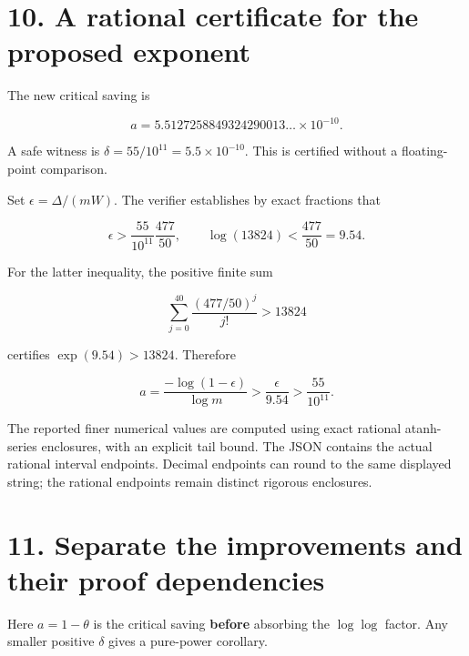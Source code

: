 \documentclass[
  11pt,
  letterpaper,
]{article}
\begin{document}
\section{10. A rational certificate for the proposed
exponent}\label{a-rational-certificate-for-the-proposed-exponent}

The new critical saving is

\[
a=5.5127258849324290013\ldots\times10^{-10}.
\]

A safe witness is \(\delta=55/10^{11}=5.5\times10^{-10}\). This is
certified without a floating-point comparison.

Set \(\epsilon=\Delta/(mW)\). The verifier establishes by exact
fractions that

\[
\epsilon>\frac{55}{10^{11}}\frac{477}{50},\qquad \log(13824)<\frac{477}{50}=9.54.
\]

For the latter inequality, the positive finite sum

\[
\sum_{j=0}^{40}\frac{(477/50)^j}{j!}>13824
\]

certifies \(\exp(9.54)>13824\). Therefore

\[
a=\frac{-\log(1-\epsilon)}{\log m}
>\frac{\epsilon}{9.54}>\frac{55}{10^{11}}.
\]

The reported finer numerical values are computed using exact rational
atanh-series enclosures, with an explicit tail bound. The JSON contains
the actual rational interval endpoints. Decimal endpoints can round to
the same displayed string; the rational endpoints remain distinct
rigorous enclosures.

\clearpage
\section{11. Separate the improvements and their proof
dependencies}\label{separate-the-improvements-and-their-proof-dependencies}

Here \(a=1-\theta\) is the critical saving \textbf{before} absorbing the
\(\log\log\) factor. Any smaller positive \(\delta\) gives a pure-power
corollary.
\end{document}
